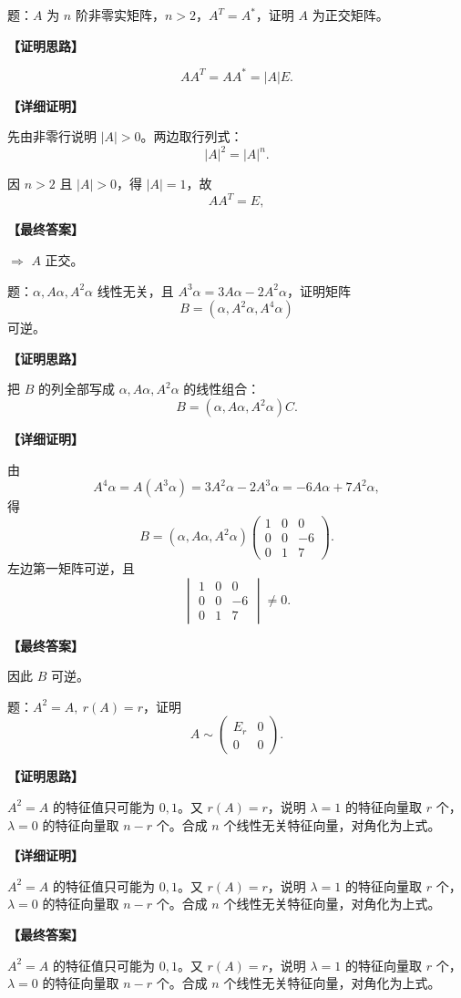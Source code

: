 ﻿\documentclass[11pt,a4paper,UTF8]{ctexart}
\begin{document}
\begin{answerbox}[2020--2021 证明八(2)：\ensuremath{A^T=A^*} 推正交矩阵]
题：$A$ 为 $n$ 阶非零实矩阵，$n>2$，$A^T=A^*$，证明 $A$ 为正交矩阵。

\textbf{【证明思路】}

\[AA^T=AA^*=|A|E.\]

\textbf{【详细证明】}

先由非零行说明 $|A|>0$。两边取行列式：
\[|A|^2=|A|^n.\]

因 $n>2$ 且 $|A|>0$，得 $|A|=1$，故
\[AA^T=E,\]

\textbf{【最终答案】}

$\Rightarrow$ $A$ 正交。
\end{answerbox}
\begin{answerbox}
题：$\alpha,A\alpha,A^2\alpha$ 线性无关，且 $A^3\alpha=3A\alpha-2A^2\alpha$，证明矩阵
\[
B=(\alpha,A^2\alpha,A^4\alpha)
\]
可逆。

\textbf{【证明思路】}

把 $B$ 的列全部写成 $\alpha,A\alpha,A^2\alpha$ 的线性组合：
\[B=(\alpha,A\alpha,A^2\alpha)C.\]

\textbf{【详细证明】}

由
\[
A^4\alpha=A(A^3\alpha)=3A^2\alpha-2A^3\alpha=-6A\alpha+7A^2\alpha,
\]
得
\[
B=(\alpha,A\alpha,A^2\alpha)
\begin{pmatrix}
1&0&0\\
0&0&-6\\
0&1&7
\end{pmatrix}.
\]
左边第一矩阵可逆，且
\[
\begin{vmatrix}
1&0&0\\
0&0&-6\\
0&1&7
\end{vmatrix}\ne0.
\]

\textbf{【最终答案】}

因此 $B$ 可逆。
\end{answerbox}
\begin{answerbox}
题：$A^2=A,\ r(A)=r$，证明
\[A\sim \begin{pmatrix}E_r&0\\0&0\end{pmatrix}.\]

\textbf{【证明思路】}

$A^2=A$ 的特征值只可能为 $0,1$。又 $r(A)=r$，说明 $\lambda=1$ 的特征向量取 $r$ 个，$\lambda=0$ 的特征向量取 $n-r$ 个。合成 $n$ 个线性无关特征向量，对角化为上式。

\textbf{【详细证明】}

$A^2=A$ 的特征值只可能为 $0,1$。又 $r(A)=r$，说明 $\lambda=1$ 的特征向量取 $r$ 个，$\lambda=0$ 的特征向量取 $n-r$ 个。合成 $n$ 个线性无关特征向量，对角化为上式。

\textbf{【最终答案】}

$A^2=A$ 的特征值只可能为 $0,1$。又 $r(A)=r$，说明 $\lambda=1$ 的特征向量取 $r$ 个，$\lambda=0$ 的特征向量取 $n-r$ 个。合成 $n$ 个线性无关特征向量，对角化为上式。
\end{answerbox}
\end{document}
